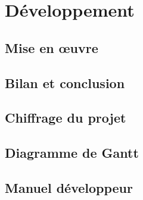 \documentclass{polytech/polytech}
\begin{document}
\part{Développement}


\chapter{Mise en œuvre}


\chapter{Bilan et conclusion}


\appendix

\chapter{Chiffrage du projet}

\chapter{Diagramme de Gantt}

\chapter{Manuel développeur}
\end{document}
